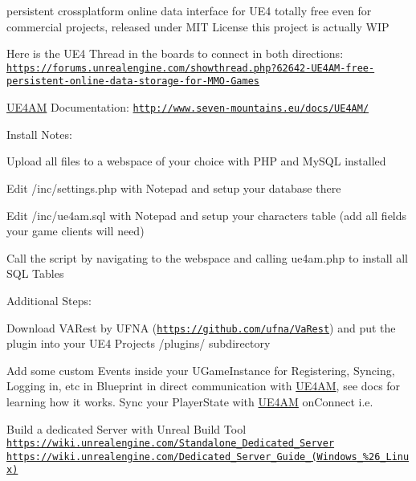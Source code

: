 persistent crossplatform online data interface for U\-E4 totally free even for commercial projects, released under M\-I\-T License this project is actually W\-I\-P

Here is the U\-E4 Thread in the boards to connect in both directions\-: \href{https://forums.unrealengine.com/showthread.php?62642-UE4AM-free-persistent-online-data-storage-for-MMO-Games}{\tt https\-://forums.\-unrealengine.\-com/showthread.\-php?62642-\/\-U\-E4\-A\-M-\/free-\/persistent-\/online-\/data-\/storage-\/for-\/\-M\-M\-O-\/\-Games}

\hyperlink{class_u_e4_a_m}{U\-E4\-A\-M} Documentation\-: \href{http://www.seven-mountains.eu/docs/UE4AM/}{\tt http\-://www.\-seven-\/mountains.\-eu/docs/\-U\-E4\-A\-M/}

Install Notes\-:
\begin{DoxyEnumerate}
\item Upload all files to a webspace of your choice with P\-H\-P and My\-S\-Q\-L installed
\item Edit /inc/settings.php with Notepad and setup your database there
\item Edit /inc/ue4am.sql with Notepad and setup your characters table (add all fields your game clients will need)
\item Call the script by navigating to the webspace and calling ue4am.\-php to install all S\-Q\-L Tables
\end{DoxyEnumerate}

Additional Steps\-:
\begin{DoxyEnumerate}
\item Download V\-A\-Rest by U\-F\-N\-A (\href{https://github.com/ufna/VaRest}{\tt https\-://github.\-com/ufna/\-Va\-Rest}) and put the plugin into your U\-E4 Projects /plugins/ subdirectory
\item Add some custom Events inside your U\-Game\-Instance for Registering, Syncing, Logging in, etc in Blueprint in direct communication with \hyperlink{class_u_e4_a_m}{U\-E4\-A\-M}, see docs for learning how it works. Sync your Player\-State with \hyperlink{class_u_e4_a_m}{U\-E4\-A\-M} on\-Connect i.\-e.
\item Build a dedicated Server with Unreal Build Tool \href{https://wiki.unrealengine.com/Standalone_Dedicated_Server}{\tt https\-://wiki.\-unrealengine.\-com/\-Standalone\-\_\-\-Dedicated\-\_\-\-Server} \href{https://wiki.unrealengine.com/Dedicated_Server_Guide_(Windows_%26_Linux)}{\tt https\-://wiki.\-unrealengine.\-com/\-Dedicated\-\_\-\-Server\-\_\-\-Guide\-\_\-(\-Windows\-\_\-\%26\-\_\-\-Linux)}
\end{DoxyEnumerate}

